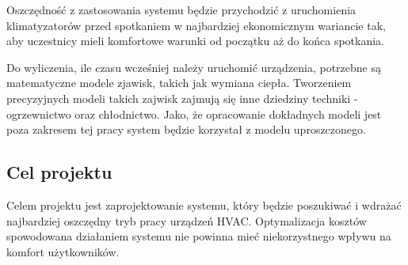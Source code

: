Oszczędność z zastosowania systemu będzie przychodzić z uruchomienia klimatyzatorów przed spotkaniem w najbardziej ekonomicznym wariancie tak, aby uczestnicy mieli komfortowe warunki od początku aż do końca spotkania. 

Do wyliczenia, ile czasu wcześniej należy uruchomić urządzenia, potrzebne są matematyczne modele zjawisk, takich jak wymiana ciepła. 
Tworzeniem precyzyjnych modeli takich zajwisk zajmują się inne dziedziny techniki - ogrzewnictwo oraz chłodnictwo. 
Jako, że opracowanie dokładnych modeli jest poza zakresem tej pracy system będzie korzystał z modelu uproszczonego. 

\subsection*{Cel projektu}
Celem projektu jest zaprojektowanie systemu, który będzie poszukiwać i wdrażać najbardziej oszczędny tryb pracy urządzeń HVAC. Optymalizacja kosztów spowodowana działaniem systemu nie powinna mieć niekorzystnego wpływu na komfort użytkowników.